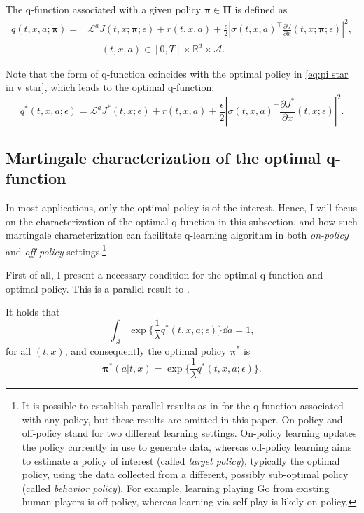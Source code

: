 \begin{definition}
	\label{def:def q function}
	The q-function associated with a given policy $\bm\pi\in \bm\Pi$ is defined as
	\begin{equation}
		\label{eq:q rate}
		\begin{aligned}
			q(t,x,a;\bm{\pi}) = & \mathcal{L}^a J(t,x;\bm\pi;\epsilon) + r(t,x,a) +  \frac{\epsilon}{2} |\sigma(t,x,a)^\top\frac{\partial J}{\partial x}(t,x;\bm\pi;\epsilon)|^2,\\
			& \;\;\;\;\;(t,x,a)\in [0,T]\times \mathbb{R}^d\times \mathcal{A}.
		\end{aligned}
	\end{equation}
\end{definition}
Note that the form of q-function coincides with the optimal policy in \eqref{eq:pi star in v star}, which leads to the optimal q-function:
\begin{equation}
	\label{eq:optimal q}
	q^*(t,x,a;\epsilon) = \mathcal{L}^a J^*(t,x;\epsilon) + r(t,x,a) +  \frac{\epsilon}{2} \left| \sigma(t,x,a)^\top\frac{\partial J^*}{\partial x}(t,x;\epsilon) \right|^2. 
\end{equation}


\subsection{Martingale characterization of the optimal q-function}
In most applications, only the optimal policy is of the interest. Hence, I will focus on the characterization of the optimal q-function in this subsection, and how such martingale characterization can facilitate q-learning algorithm in both \textit{on-policy} and \textit{off-policy} settings.\footnote{It is possible to establish parallel results as in \citet{jia2022q} for the q-function associated with any policy, but these results are omitted in this paper. On-policy and off-policy stand for two different learning settings. On-policy learning updates the policy currently in use to generate data, whereas off-policy learning aims to estimate a policy of interest (called \textit{target policy}), typically the optimal policy, using the data collected from a different, possibly sub-optimal policy (called \textit{behavior policy}). For example, learning playing Go from existing human players is off-policy, whereas learning via self-play is likely on-policy.}

First of all, I present a necessary condition for the optimal q-function and optimal policy. This is a parallel result to \citet[Proposition 8]{jia2022q}.
\begin{proposition}\label{prop:qstar1}
	It holds that
	\begin{equation}
		\label{eq:optimal q hjb}
		\int_{\mathcal A} \exp\{ \frac{1}{\lambda} q^*(t,x,a;\epsilon) \}\dd a = 1,
	\end{equation}
	for all $(t,x)$, and consequently
	the optimal policy $\bm\pi^*$ is  	\begin{equation}
		\label{eq:optimal pi and q}
		\bm\pi^*(a|t,x) = \exp\{ \frac{1}{\lambda} q^*(t,x,a;\epsilon) \} .
	\end{equation}
\end{proposition}

